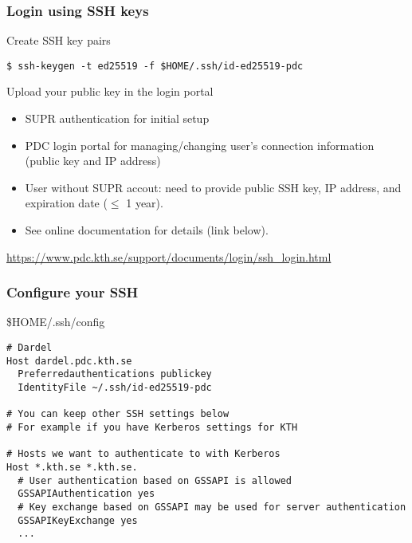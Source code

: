 \begin{frame}[fragile]
\frametitle{Login using SSH keys}

\begin{block}{Create SSH key pairs}
\begin{verbatim}
$ ssh-keygen -t ed25519 -f $HOME/.ssh/id-ed25519-pdc
\end{verbatim}
\end{block}

\begin{block}{Upload your public key in the login portal}
    \begin{itemize}
        \item SUPR authentication for initial setup
        \item PDC login portal for managing/changing user’s connection information (public key and IP address)
        \item User without SUPR accout: need to provide public SSH key, IP address, and expiration date ($\le$ 1 year).
        \item See online documentation for details (link below).
    \end{itemize}
\end{block}

\href{https://www.pdc.kth.se/support/documents/login/ssh\_login.html}{https://www.pdc.kth.se/support/documents/login/ssh\_login.html}

\end{frame}


\begin{frame}[fragile]
\frametitle{Configure your SSH}

\begin{block}{\$HOME/.ssh/config}
\footnotesize
\begin{verbatim}
# Dardel
Host dardel.pdc.kth.se
  Preferredauthentications publickey
  IdentityFile ~/.ssh/id-ed25519-pdc

# You can keep other SSH settings below
# For example if you have Kerberos settings for KTH

# Hosts we want to authenticate to with Kerberos
Host *.kth.se *.kth.se.
  # User authentication based on GSSAPI is allowed
  GSSAPIAuthentication yes
  # Key exchange based on GSSAPI may be used for server authentication
  GSSAPIKeyExchange yes
  ...
\end{verbatim}
\end{block}

\end{frame}
